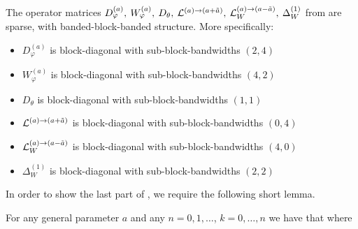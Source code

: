 \begin{theorem}\label{theorem:sc:sparsityofdifferentialoperators}
	The operator matrices $D_\varphi^{(a)}, \: W_\varphi^{(a)}, \: D_\theta, \: \mathcal{L}^{(a)\to(a+\tilde a)}, \: \mathcal{L}_W^{(a)\to(a-\tilde a)}, \: \Delta^{(1)}_W$ from  are sparse, with banded-block-banded structure. More specifically:
\begin{itemize}
	\item $D_\varphi^{(a)}$ is block-diagonal with sub-block-bandwidths $(2, 4)$
  	\item $W_\varphi^{(a)}$ is block-diagonal with sub-block-bandwidths $(4, 2)$
	\item $D_\theta$ is block-diagonal with sub-block-bandwidths $(1, 1)$
	\item $\mathcal{L}^{(a)\to(a+\tilde a)}$ is block-diagonal with sub-block-bandwidths $(0, 4)$
	\item $\mathcal{L}_W^{(a)\to(a-\tilde a)}$ is block-diagonal with sub-block-bandwidths $(4, 0)$
	\item $\Delta^{(1)}_W$ is block-diagonal with sub-block-bandwidths $(2, 2)$
\end{itemize}
\end{theorem}

In order to show the last part of , we require the following short lemma.

\begin{lemma}\label{lemma:sc:Rsecondderivative}
	For any general parameter $a$ and any $n = 0,1,\dots$, $k = 0,\dots,n$ we have that
where 
\end{lemma}

